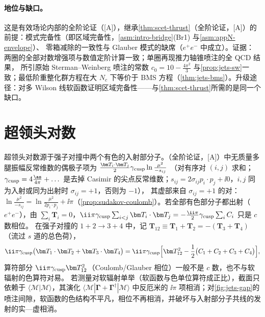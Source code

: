 \paragraph{地位与缺口。}
这是有效场论内部的全阶论证（[A]），继承\cref{thm:scet-thrust}（全阶论证，[A]）的前提：模式完备性（即区域完备性，\cref{asm:intro-bridge}(Br1) 与\cref{asm:appN-envelope}）、
零箱减除的一致性与 Glauber 模式的缺席（$e^+e^-$ 中成立）。证据：两圈的全部对数增强项与数值定阶计算一致\cite{Becher:2016mmh}；单圈再现推力轴锥喷注的全 QCD 结果，
所引原始 Sterman--Weinberg 喷注的常数 $c_0=10-\frac{4\pi^2}{3}$ 与\cref{prop:jets-sw}一致\cite[式~(1)]{Becher:2015hka}；最低阶重整化群方程在大 $N_c$ 下等价于 BMS 方程（\cref{thm:jets-bms}）\cite[第~5~节]{Becher:2016mmh}。升级途径：对多 Wilson 线软函数证明区域完备性——与\cref{thm:scet-thrust}所需的是同一个缺口。
\section{超领头对数}\label{sec:jets-sll}

超领头对数源于强子对撞中两个有色的入射部分子。（全阶论证，[A]）中无质量多腿振幅反常维数的偶极子项为 $\frac{\bm T_i\cdot\bm T_j}{2}\gamma_{\rm cusp}\ln\frac{\mu^2}{-s_{ij}}$
（对有序对 $(i,j)$ 求和；$\gamma_{\rm cusp}=4\frac{\as}{4\pi}+\dots$ 是去掉 Casimir 的尖点反常维数；$s_{ij}=2\sigma_{ij}p_i\cdot p_j+\ii0$，$i,j$ 同为入射或同为出射时 $\sigma_{ij}=+1$，否则为 $-1$），
其虚部来自 $\sigma_{ij}=+1$ 的对：$\ln\frac{\mu^2}{-s_{ij}}=\ln\frac{\mu^2}{2p_i\cdot p_j}+\ii\pi$（\cref{prop:sudakov-coulomb}）。若全部有色部分子都出射（$e^+e^-$），由 $\sum_i\bm T_i=0$，$\ii\pi\gamma_{\rm cusp}\sum_{i<j}\bm T_i\cdot\bm T_j=-\frac{\ii\pi}{2}\gamma_{\rm cusp}\sum_iC_i$ 只是 $c$ 数相位。
在强子对撞的 $1+2\to3+4$ 中，记 $\bm T_{12}\equiv\bm T_1+\bm T_2=-(\bm T_3+\bm T_4)$（流过 $s$ 道的总色荷），
\begin{equation}\label{eq:jets-coulomb-pp}
\ii\pi\gamma_{\rm cusp}\big(\bm T_1\cdot\bm T_2+\bm T_3\cdot\bm T_4\big)=\ii\pi\gamma_{\rm cusp}\Big[\bm T_{12}^2-\frac12\big(C_1+C_2+C_3+C_4\big)\Big],
\end{equation}
算符部分 $\ii\pi\gamma_{\rm cusp}\bm T_{12}^2$（Coulomb/Glauber 相位）一般不是 $c$ 数，也不与软辐射的色算符对易。
若测量对软辐射单举（软函数与色单位算符成正比），截面只依赖于 $\langle\mathcal M|\mathcal M\rangle$，其演化 $\langle\mathcal M|\bm\Gamma+\bm\Gamma^\dagger|\mathcal M\rangle$ 中反厄米的 $\ii\pi$ 项相消；对\cref{fig:jets-gap}的喷注间隙，软函数的色结构不平凡，相位不再相消，并破坏与入射部分子共线的发射的实—虚相消。

